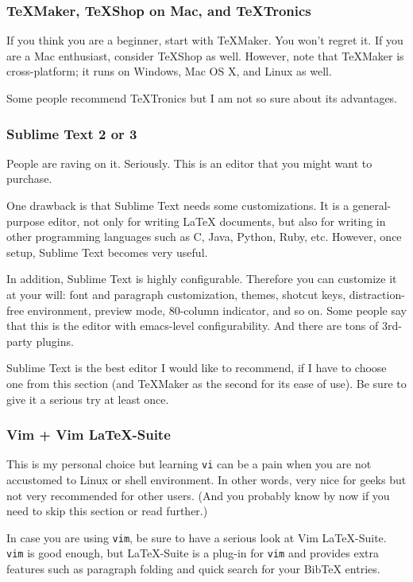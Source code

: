 \documentclass[11pt]{article}
\begin{document}
\subsubsection{TeXMaker, TeXShop on Mac, and TeXTronics}
If you think you are a beginner, start with TeXMaker. You won't regret it. If
you are a Mac enthusiast, consider TeXShop as well. However, note that
TeXMaker is cross-platform; it runs on Windows, Mac OS X, and Linux as well.

Some people recommend TeXTronics but I am not so sure about its advantages.

\subsubsection{Sublime Text 2 or 3}
People are raving on it. Seriously. This is an editor that you might want to
purchase. 

One drawback is that Sublime Text needs some customizations. It is a
general-purpose editor, not only for writing LaTeX documents, but also for
writing in other programming languages such as C, Java, Python, Ruby, etc.
However, once setup, Sublime Text becomes very useful. 

In addition, Sublime Text is highly configurable. Therefore you can customize
it at your will: font and paragraph customization, themes, shotcut keys,
distraction-free environment, preview mode, 80-column indicator, and so on. 
Some people say that this is the editor with emacs-level configurability.
And there are tons of 3rd-party plugins. 

Sublime Text is the best editor I would like to recommend, if I have to choose
one from this section (and TeXMaker as the second for its ease of use). Be
sure to give it a serious try at least once.

\subsubsection{Vim + Vim LaTeX-Suite}
This is my personal choice but learning \texttt{vi} can be a pain when you are
not accustomed to Linux or shell environment. In other words, very nice for
geeks but not very recommended for other users. (And you probably know by now
if you need to skip this section or read further.)

In case you are using \texttt{vim}, be sure to have a serious look at Vim
LaTeX-Suite. \texttt{vim} is good enough, but LaTeX-Suite is a plug-in for
\texttt{vim} and provides extra features such as paragraph folding and quick
search for your BibTeX entries. 
\end{document}
